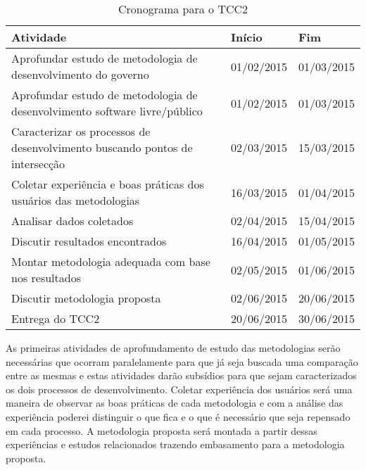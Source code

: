 \newpage

\begin{table}[htb]
\center
\footnotesize
\begin{tabular}{|p{8cm}|p{3cm}|p{3cm}|}
  \hline
   \textbf{Atividade} & \textbf{Início} & \textbf{Fim}\\
    \hline
	Aprofundar estudo de metodologia de desenvolvimento do governo & 01/02/2015 & 01/03/2015\\
    \hline
	Aprofundar estudo de metodologia de desenvolvimento software livre/público & 01/02/2015 & 01/03/2015\\
    \hline
        Caracterizar os processos de desenvolvimento buscando pontos de intersecção & 02/03/2015 & 15/03/2015\\
    \hline
	Coletar experiência e boas práticas dos usuários das metodologias & 16/03/2015 & 01/04/2015\\
    \hline
	Analisar dados coletados & 02/04/2015 & 15/04/2015\\
    \hline 
	Discutir resultados encontrados & 16/04/2015 & 01/05/2015\\
    \hline
	Montar metodologia adequada com base nos resultados & 02/05/2015 & 01/06/2015\\
    \hline
	Discutir metodologia proposta & 02/06/2015 & 20/06/2015\\
    \hline
	Entrega do TCC2 & 20/06/2015 & 30/06/2015\\
    \hline
\end{tabular}
\caption{Cronograma para o TCC2}
\label{cronograma}
\end{table}

As primeiras atividades de aprofundamento de estudo das metodologias serão 
necessárias que ocorram paralelamente para que já seja buscada uma comparação 
entre as mesmas e estas atividades darão subsídios para que sejam caracterizados 
os dois processos de desenvolvimento.
%
Coletar experiência dos usuários será uma maneira de observar as boas práticas de cada 
metodologia e com a análise das experiência poderei distinguir o que fica e o que 
é necessário que seja repensado em cada processo.
%
A metodologia proposta será montada a partir dessas experiências e estudos relacionados
trazendo embasamento para a metodologia proposta. 
